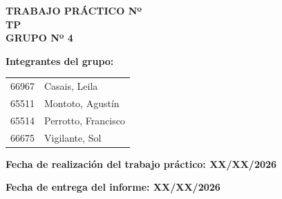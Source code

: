 \begin{center}
    
    {\large \textbf{TRABAJO PRÁCTICO Nº}}\\[0.5cm]
    
    {\Large \textbf{TP }}\\[1cm]
    
    {\normalsize \textbf{GRUPO Nº 4}}\\[0.5cm]

\end{center}

\vspace{0.5cm}

\textbf{Integrantes del grupo:}

\vspace{0.3cm}

\begin{tabular}{p{5cm} p{8cm}}
66967 & Casais, Leila \\
65511 & Montoto, Agustín \\
65514 & Perrotto, Francisco \\
66675 & Vigilante, Sol \\
\end{tabular}

\vspace{0.8cm}

\textbf{Fecha de realización del trabajo práctico: XX/XX/2026} \\
\vspace{0.3cm}

\textbf{Fecha de entrega del informe: XX/XX/2026}

\vspace{1cm}

\newpage